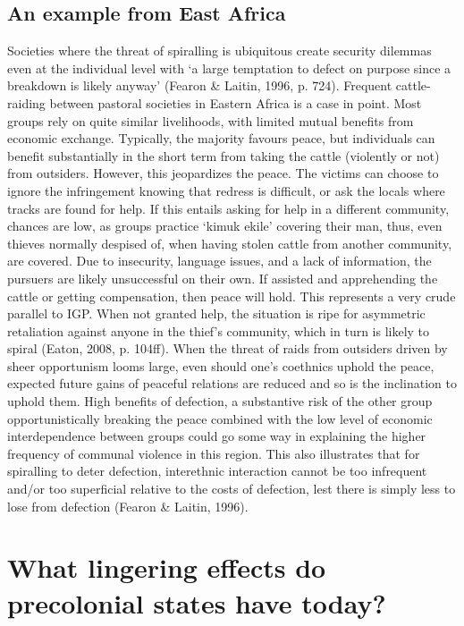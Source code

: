 \documentclass[12pt]{article}
\begin{document}
\subsection{An example from East Africa}

Societies where the threat of spiralling is ubiquitous create security dilemmas
even at the individual level with ‘a large temptation to defect on purpose since
a breakdown is likely anyway’ (Fearon \& Laitin, 1996, p. 724). Frequent
cattle-raiding between pastoral societies in Eastern Africa is a case in point.
Most groups rely on quite similar livelihoods, with limited mutual benefits from
economic exchange. Typically, the majority favours peace, but individuals can
benefit substantially in the short term from taking the cattle (violently or
not) from outsiders. However, this jeopardizes the peace. The victims can choose
to ignore the infringement knowing that redress is difficult, or ask the locals
where tracks are found for help. If this entails asking for help in a different
community, chances are low, as groups practice ‘kimuk ekile’ covering their man,
thus, even thieves normally despised of, when having stolen cattle from another
community, are covered. Due to insecurity, language issues, and a lack of
information, the pursuers are likely unsuccessful on their own. If assisted and
apprehending the cattle or getting compensation, then peace will hold. This
represents a very crude parallel to IGP. When not granted help, the situation is
ripe for asymmetric retaliation against anyone in the thief’s community, which
in turn is likely to spiral (Eaton, 2008, p. 104ff). When the threat of raids
from outsiders driven by sheer opportunism looms large, even should one’s
coethnics uphold the peace, expected future gains of peaceful relations are
reduced and so is the inclination to uphold them. High benefits of defection, a
substantive risk of the other group opportunistically breaking the peace
combined with the low level of economic interdependence between groups could go
some way in explaining the higher frequency of communal violence in this region.
This also illustrates that for spiralling to deter defection, interethnic
interaction cannot be too infrequent and/or too superficial relative to the
costs of defection, lest there is simply less to lose from defection (Fearon \&
Laitin, 1996). 


\section{What lingering effects do precolonial states have today?}
\end{document}
